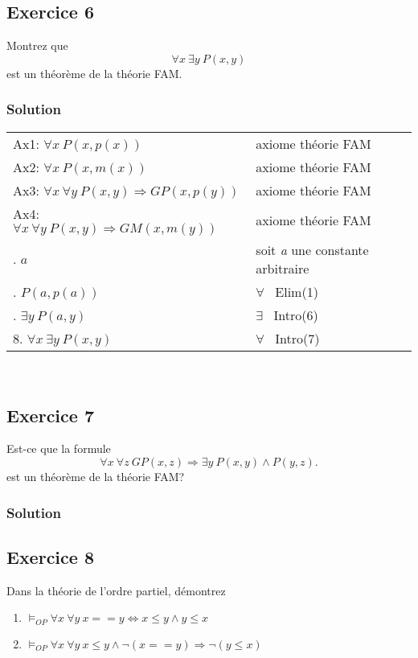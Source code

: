 \subsection*{Exercice 6}
Montrez que
$$
\forall x \ \exists y \ P(x, y)
$$
est un th\'{e}or\`{e}me de la th\'{e}orie FAM.


    \subsubsection*{Solution}
    \begin{tabular}{|l|l|}
    \hline
        Ax1: $\forall x \ P(x, p(x))$ & axiome th\'{e}orie FAM \\
        Ax2: $\forall x \ P(x, m(x))$ & axiome th\'{e}orie FAM \\
        Ax3: $\forall x \ \forall y \ P(x, y) \Rightarrow GP(x, p(y))$ & axiome th\'{e}orie FAM  \\
        Ax4: $\forall x \ \forall y \ P(x, y) \Rightarrow GM(x, m(y))$ & axiome th\'{e}orie FAM \\
        \indent 5. $ a $ & soit \textit{a} une constante arbitraire \\
        \indent 6. $ P(a, p(a)) $ & $\forall$ \ Elim(1)\\
        \indent 7.  $\exists y \ P(a,y) $ & $\exists$ \ Intro(6)\\
        8. $ \forall x\ \exists y \ P(x,y) $ & $\forall$ \ Intro(7)\\
    \hline
    \end{tabular}\\

\subsection*{Exercice 7}
Est-ce que la formule
$$
\forall x \ \forall z \ GP(x, z) \Rightarrow \exists y \ P(x, y) \wedge P(y, z).
$$
est un th\'{e}or\`{e}me de la th\'{e}orie FAM?


    \subsubsection*{Solution}

\subsection*{Exercice 8}
Dans la th\'{e}orie de l'ordre partiel, d\'{e}montrez
\begin{enumerate}
\item $\models_{OP} \forall x \ \forall y \ x == y \Leftrightarrow x \leq y \wedge y \leq x$
\item $\models_{OP} \forall x \ \forall y \ x \leq y \wedge \neg (x == y) \Rightarrow \neg (y \leq x)$
\end{enumerate}

